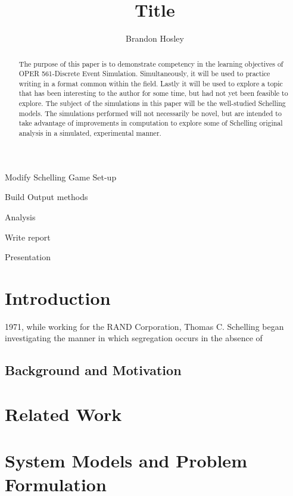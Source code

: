 \documentclass[sigplan,screen]{acmart}
\begin{document}
\title{Title}
\author{Brandon Hosley}


	\begin{abstract}
		The purpose of this paper is to demonstrate competency in the learning 
		objectives of OPER 561-Discrete Event Simulation.
		Simultaneously, it will be used to practice writing in a format
		common within the field.
		Lastly it will be used to explore a topic that has been interesting
		to the author for some time, but had not yet been feasible to explore.
		The subject of the simulations in this paper will be the well-studied
		Schelling models. The simulations performed will not necessarily be
		novel, but are intended to take advantage of improvements in computation
		to explore some of Schelling original analysis in a simulated, experimental manner.
	\end{abstract}
	

\maketitle



Modify Schelling Game Set-up

Build Output methods

Analysis

Write report

Presentation

\section{Introduction}

 1971, while working for the RAND Corporation, Thomas C. Schelling began investigating
the manner in which segregation occurs in the absence of 

\subsection{Background and Motivation}

\section{Related Work}

\section{System Models and Problem Formulation}
\end{document}
